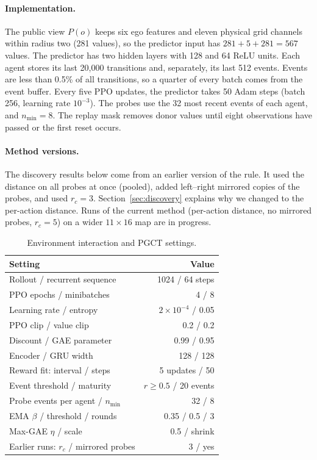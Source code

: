 \documentclass{article}
\begin{document}
\paragraph{Implementation.} The public view $P(o)$ keeps six ego features and eleven physical grid channels within radius two (281 values), so the predictor input has $281+5+281=567$ values. The predictor has two hidden layers with 128 and 64 ReLU units. Each agent stores its last 20{,}000 transitions and, separately, its last 512 events. Events are less than 0.5\% of all transitions, so a quarter of every batch comes from the event buffer. Every five PPO updates, the predictor takes 50 Adam steps (batch 256, learning rate $10^{-3}$). The probes use the 32 most recent events of each agent, and $n_{\min}=8$. The replay mask removes donor values until eight observations have passed or the first reset occurs.

\paragraph{Method versions.} The discovery results below come from an earlier version of the rule. It used the distance on all probes at once (pooled), added left--right mirrored copies of the probes, and used $r_c=3$. Section~\ref{sec:discovery} explains why we changed to the per-action distance. Runs of the current method (per-action distance, no mirrored probes, $r_c=5$) on a wider $11\times16$ map are in progress.

\begin{table}[t]\centering\small
\begin{tabular}{lr}\toprule
Setting & Value\\\midrule
Rollout / recurrent sequence & 1024 / 64 steps\\
PPO epochs / minibatches & 4 / 8\\
Learning rate / entropy & $2\times10^{-4}$ / 0.05\\
PPO clip / value clip & 0.2 / 0.2\\
Discount / GAE parameter & 0.99 / 0.95\\
Encoder / GRU width & 128 / 128\\
Reward fit: interval / steps & 5 updates / 50\\
Event threshold / maturity & $r\ge0.5$ / 20 events\\
Probe events per agent / $n_{\min}$ & 32 / 8\\
EMA $\beta$ / threshold / rounds & 0.35 / 0.5 / 3\\
Max-GAE $\eta$ / scale & 0.5 / shrink\\
Earlier runs: $r_c$ / mirrored probes & 3 / yes\\\bottomrule
\end{tabular}
\caption{Environment interaction and PGCT settings.}\label{tab:settings}
\end{table}
\end{document}
